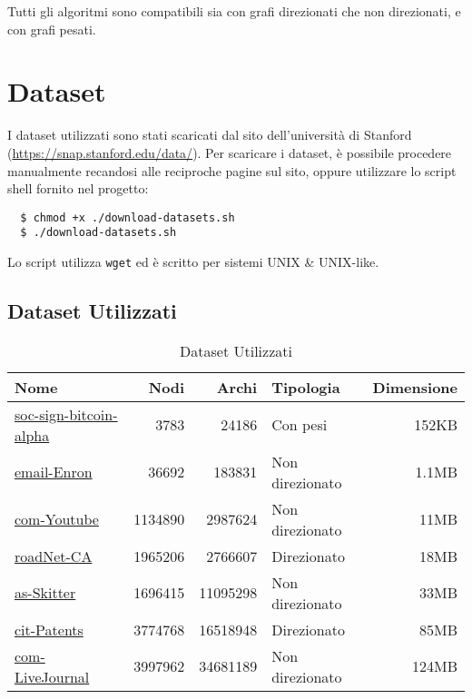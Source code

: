 \documentclass{article}
\begin{document}
Tutti gli algoritmi sono compatibili sia con grafi direzionati che non direzionati, e con grafi pesati.



\section{Dataset}\label{sec:dataset}
I dataset utilizzati sono stati scaricati dal sito dell'università di Stanford (\url{https://snap.stanford.edu/data/}).
Per scaricare i dataset, è possibile procedere manualmente recandosi alle reciproche pagine sul sito, oppure utilizzare lo script shell fornito nel progetto:
\begin{lstlisting}
  $ chmod +x ./download-datasets.sh
  $ ./download-datasets.sh
\end{lstlisting}
Lo script utilizza \texttt{wget} ed è scritto per sistemi UNIX \& UNIX-like.

\subsection{Dataset Utilizzati}
\begin{table}[h]
	\centering
	\begin{tabular}{|l|r|r|l|r|}
		\hline
		Nome                                                                                      & Nodi    & Archi    & Tipologia       & Dimensione \\
		\hline
		\href{https://snap.stanford.edu/data/soc-sign-bitcoin-alpha.html}{soc-sign-bitcoin-alpha} & 3783    & 24186    & Con pesi        & 152KB      \\
		\href{https://snap.stanford.edu/data/email-Enron.html}{email-Enron}                       & 36692   & 183831   & Non direzionato & 1.1MB      \\
		\href{https://snap.stanford.edu/data/com-Youtube.html}{com-Youtube}                       & 1134890 & 2987624  & Non direzionato & 11MB       \\
		\href{https://snap.stanford.edu/data/roadNet-CA.html}{roadNet-CA}                         & 1965206 & 2766607  & Direzionato     & 18MB       \\
		\href{https://snap.stanford.edu/data/as-Skitter.html}{as-Skitter}                         & 1696415 & 11095298 & Non direzionato & 33MB       \\
		\href{https://snap.stanford.edu/data/cit-Patents.html}{cit-Patents}                       & 3774768 & 16518948 & Direzionato     & 85MB       \\
		\href{https://snap.stanford.edu/data/com-LiveJournal.html}{com-LiveJournal}               & 3997962 & 34681189 & Non direzionato & 124MB      \\
		\hline
	\end{tabular}
	\caption{Dataset Utilizzati}
\end{table}
\end{document}
